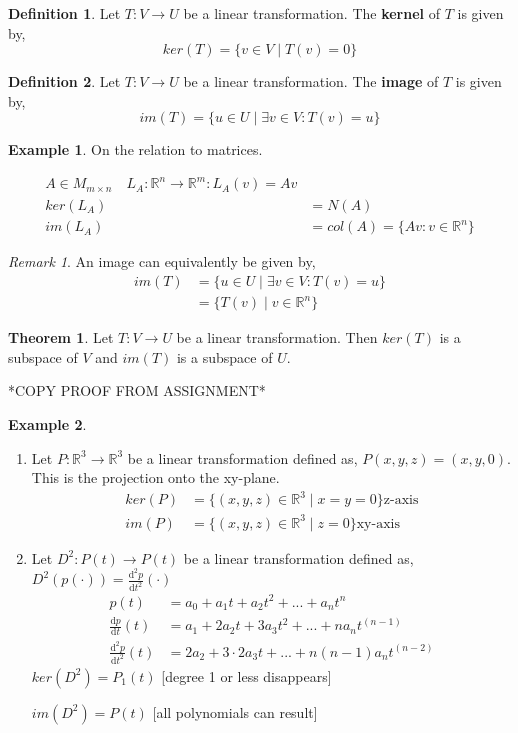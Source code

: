 \documentclass{report}
\theoremstyle{definition}
\newtheorem*{_def}{Definition}
\newtheorem{_thm}{Theorem}[section]
\newtheorem{ex}{Example}[section]
\theoremstyle{remark}
\newtheorem{_rem}{Remark}[section]
\begin{document}
\begin{_def}
Let $T:V\rightarrow U$ be a linear transformation.
The \textbf{kernel} of $T$ is given by,
\[ker(T)=\{v\in V\mid T(v)=0\}\]
\end{_def}

\begin{_def}
Let $T:V\rightarrow U$ be a linear transformation.
The \textbf{image} of $T$ is given by,
\[im(T)=\{u\in U\mid \exists v\in V : T(v)=u\}\]
\end{_def}

\begin{ex} On the relation to matrices.

\begin{align*}
A\in M_{m\times n} \quad L_A:\mathbb{R}^n\rightarrow\mathbb{R}^m : L_A(v)=Av\\
ker(L_A)&=N(A) \\
im(L_A)&=col(A)=\{Av:v\in \mathbb{R}^n\}
\end{align*}
\end{ex}

\begin{_rem}
An image can equivalently be given by,
\begin{align*}
im(T)&=\{u\in U\mid \exists v\in V : T(v)=u\}\\
&=\{T(v)\mid v\in \mathbb{R}^n\}
\end{align*}
\end{_rem}

\begin{_thm}
Let $T:V\rightarrow U$ be a linear transformation.
Then $ker(T)$ is a subspace of $V$ and $im(T)$ is a subspace of $U$.
\end{_thm}

*COPY PROOF FROM ASSIGNMENT*

\begin{ex}
\begin{enumerate}
 \item Let $P:\mathbb{R}^3\rightarrow\mathbb{R}^3$ be a linear transformation defined as, $P(x,y,z)=(x,y,0)$.
 This is the projection onto the xy-plane.
 \begin{align*}
  ker(P)&=\{(x,y,z)\in\mathbb{R}^3\mid x=y=0\} \text{z-axis}\\
  im(P)&=\{(x,y,z)\in\mathbb{R}^3\mid z=0\} \text{xy-axis}
 \end{align*}
 \item Let $D^2:P(t)\rightarrow P(t)$ be a linear transformation defined as, $D^2(p(\cdot))=\frac{\mathrm{d}^2p}{\mathrm{d}t^2}(\cdot)$
 \begin{align*}
  p(t)&=a_0+a_1t+a_2t^2+...+a_nt^n\\
  \frac{\mathrm{d}p}{\mathrm{d}t}(t)&=a_1+2a_2t+3a_3t^2+...+na_nt^{(n-1)}\\
  \frac{\mathrm{d}^2p}{\mathrm{d}t^2}(t)&=2a_2+3\cdot 2a_3t+...+n(n-1)a_nt^{(n-2)}
 \end{align*}
 $ker(D^2)=P_1(t)$ [degree 1 or less disappears]
 
 $im(D^2)=P(t)$ [all polynomials can result]
\end{enumerate}
\end{ex}
\end{document}
